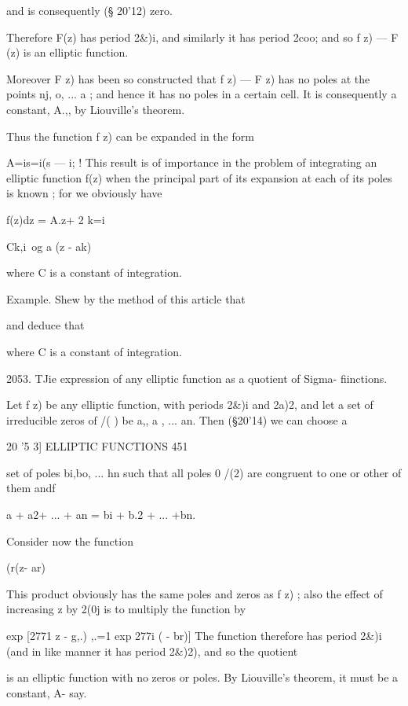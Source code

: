 {and is consequently (§ 20'12) zero. 

Therefore F(z) has period 2\&)i, and similarly it has period 2coo; and so 
f z) — F (z) is an elliptic function. 

Moreover F z) has been so constructed that f z) — F z) has no poles at 
the points nj,  o, ... a ; and hence it has no poles in a certain cell. It is 
consequently a constant, A.,, by Liouville's theorem. 

Thus the function f  z) can be expanded in the form 

A=is=i(s — i; ! 
This result is of importance in the problem of integrating an elliptic 
function f(z) when the principal part of its expansion at each of its poles is 
known ; for we obviously have 



f(z)dz = A.z+ 2 
k=i 



Ck,i\ og a (z - ak) 

where C is a constant of integration. 

Example. Shew by the method of this article that 

and deduce that 

where C is a constant of integration. 

2053. TJie expression of any elliptic function as a quotient of Sigma- 
fiinctions. 

Let f z) be any elliptic function, with periods 2\&)i and 2a)2, and let a set 
of irreducible zeros of /( ) be a,, a , ... an. Then (§20'14) we can choose a 



20 '5 3] ELLIPTIC FUNCTIONS 451 

set of poles bi,bo, ... hn such that all poles 0 /(2) are congruent to one or 
other of them andf 

a  + a2+ ... + an = bi + b.2 + ... +bn. 

Consider now the function 

  (r(z- ar) 

This product obviously has the same poles and zeros as f z) ; also the 
effect of increasing z by 2(0j is to multiply the function by 

  exp [2771  z - g,.)    
,.=1 exp  277i (  - br)] 
The function therefore has period 2\&)i (and in like manner it has period 
2\&)2), and so the quotient 

is an elliptic function with no zeros or poles. By Liouville's theorem, it must 
be a constant, A-  say. 

}

